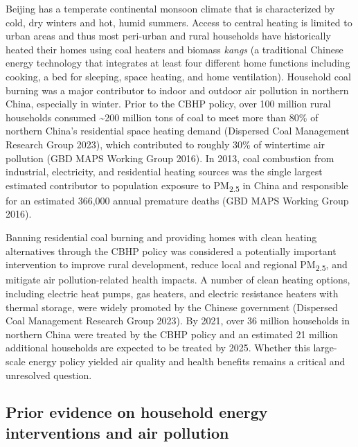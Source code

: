\documentclass[
  letterpaper,
  DIV=11,
  numbers=noendperiod]{scrartcl}
\begin{document}
Beijing has a temperate continental monsoon climate that is
characterized by cold, dry winters and hot, humid summers. Access to
central heating is limited to urban areas and thus most peri-urban and
rural households have historically heated their homes using coal heaters
and biomass \emph{kangs} (a traditional Chinese energy technology that
integrates at least four different home functions including cooking, a
bed for sleeping, space heating, and home ventilation). Household coal
burning was a major contributor to indoor and outdoor air pollution in
northern China, especially in winter. Prior to the CBHP policy, over 100
million rural households consumed \textasciitilde200 million tons of
coal to meet more than 80\% of northern China's residential space
heating demand (Dispersed Coal Management Research Group 2023), which
contributed to roughly 30\% of wintertime air pollution (GBD MAPS
Working Group 2016). In 2013, coal combustion from industrial,
electricity, and residential heating sources was the single largest
estimated contributor to population exposure to PM\textsubscript{2.5} in
China and responsible for an estimated 366,000 annual premature deaths
(GBD MAPS Working Group 2016).

Banning residential coal burning and providing homes with clean heating
alternatives through the CBHP policy was considered a potentially
important intervention to improve rural development, reduce local and
regional PM\textsubscript{2.5}, and mitigate air pollution-related
health impacts. A number of clean heating options, including electric
heat pumps, gas heaters, and electric resistance heaters with thermal
storage, were widely promoted by the Chinese government (Dispersed Coal
Management Research Group 2023). By 2021, over 36 million households in
northern China were treated by the CBHP policy and an estimated 21
million additional households are expected to be treated by 2025.
Whether this large-scale energy policy yielded air quality and health
benefits remains a critical and unresolved question.

\subsection{Prior evidence on household energy interventions and air
pollution}\label{prior-evidence-on-household-energy-interventions-and-air-pollution}
\end{document}
